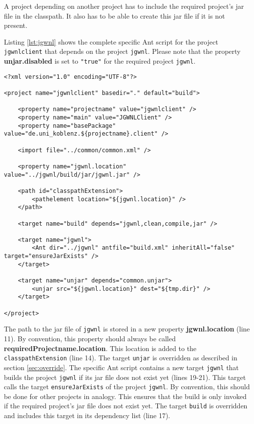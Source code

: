 \documentclass[a4paper,twoside,11pt,bibtotoc]{article}
\begin{document}
A project depending on another project has to include the required project's jar file in the classpath.
It also has to be able to create this jar file if it is not present.

Listing \ref{lst:jgwnl} shows the complete specific Ant script for the project \texttt{jgwnlclient} that depends on the project \texttt{jgwnl}.
Please note that the property \textbf{unjar.disabled} is set to \texttt{"true"} for the required project \texttt{jgwnl}.

\begin{lstlisting}[caption=specific Ant script of the project \texttt{jgwnlclient},label=lst:jgwnl,float=!ht,language=Ant]
<?xml version="1.0" encoding="UTF-8"?>

<project name="jgwnlclient" basedir="." default="build">

	<property name="projectname" value="jgwnlclient" />
	<property name="main" value="JGWNLClient" />
	<property name="basePackage" value="de.uni_koblenz.${projectname}.client" />

	<import file="../common/common.xml" />

	<property name="jgwnl.location" value="../jgwnl/build/jar/jgwnl.jar" />

	<path id="classpathExtension">
		<pathelement location="${jgwnl.location}" />
	</path>

	<target name="build" depends="jgwnl,clean,compile,jar" />

	<target name="jgwnl">
		<Ant dir="../jgwnl" antfile="build.xml" inheritAll="false" target="ensureJarExists" />
	</target>

	<target name="unjar" depends="common.unjar">
		<unjar src="${jgwnl.location}" dest="${tmp.dir}" />
	</target>

</project>
\end{lstlisting}

The path to the jar file of \texttt{jgwnl} is stored in a new property \textbf{jgwnl.location} (line 11).
By convention, this property should always be called \textbf{requiredProjectname.location}.
This location is added to the \texttt{classpathExtension} (line 14).
The target \texttt{unjar} is overridden as described in section \ref{sec:override}.
The specific Ant script contains a new target \texttt{jgwnl} that builds the project \texttt{jgwnl} if its jar file does not exist yet (lines 19-21).
This target calls the target \texttt{ensureJarExists} of the project \texttt{jgwnl}.
By convention, this should be done for other projects in analogy.
This ensures that the build is only invoked if the required project's jar file does not exist yet.
The target \texttt{build} is overridden and includes this target in its dependency list (line 17).
\end{document}
